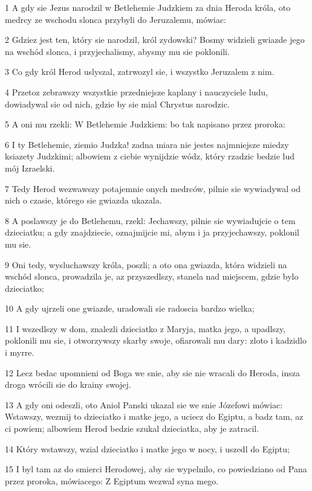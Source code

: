 \par 1 A gdy sie Jezus narodzil w Betlehemie Judzkiem za dnia Heroda króla, oto medrcy ze wschodu slonca przybyli do Jeruzalemu, mówiac:
\par 2 Gdziez jest ten, który sie narodzil, król zydowski? Bosmy widzieli gwiazde jego na wschód slonca, i przyjechalismy, abysmy mu sie poklonili.
\par 3 Co gdy król Herod uslyszal, zatrwozyl sie, i wszystko Jeruzalem z nim.
\par 4 Przetoz zebrawszy wszystkie przedniejsze kaplany i nauczyciele ludu, dowiadywal sie od nich, gdzie by sie mial Chrystus narodzic.
\par 5 A oni mu rzekli: W Betlehemie Judzkiem: bo tak napisano przez proroka:
\par 6 I ty Betlehemie, ziemio Judzka! zadna miara nie jestes najmniejsze miedzy ksiazety Judzkimi; albowiem z ciebie wynijdzie wódz, który rzadzic bedzie lud mój Izraelski.
\par 7 Tedy Herod wezwawszy potajemnie onych medrców, pilnie sie wywiadywal od nich o czasie, którego sie gwiazda ukazala.
\par 8 A poslawszy je do Betlehemu, rzekl: Jechawszy, pilnie sie wywiadujcie o tem dzieciatku; a gdy znajdziecie, oznajmijcie mi, abym i ja przyjechawszy, poklonil mu sie.
\par 9 Oni tedy, wysluchawszy króla, poszli; a oto ona gwiazda, która widzieli na wschód slonca, prowadzila je, az przyszedlszy, stanela nad miejscem, gdzie bylo dzieciatko;
\par 10 A gdy ujrzeli one gwiazde, uradowali sie radoscia bardzo wielka;
\par 11 I wszedlszy w dom, znalezli dzieciatko z Maryja, matka jego, a upadlszy, poklonili mu sie, i otworzywszy skarby swoje, ofiarowali mu dary: zloto i kadzidlo i myrre.
\par 12 Lecz bedac upomnieni od Boga we snie, aby sie nie wracali do Heroda, insza droga wrócili sie do krainy swojej.
\par 13 A gdy oni odeszli, oto Aniol Panski ukazal sie we snie Józefowi mówiac: Wstawszy, wezmij to dzieciatko i matke jego, a uciecz do Egiptu, a badz tam, az ci powiem; albowiem Herod bedzie szukal dzieciatka, aby je zatracil.
\par 14 Który wstawszy, wzial dzieciatko i matke jego w nocy, i uszedl do Egiptu;
\par 15 I byl tam az do smierci Herodowej, aby sie wypelnilo, co powiedziano od Pana przez proroka, mówiacego: Z Egiptum wezwal syna mego.
